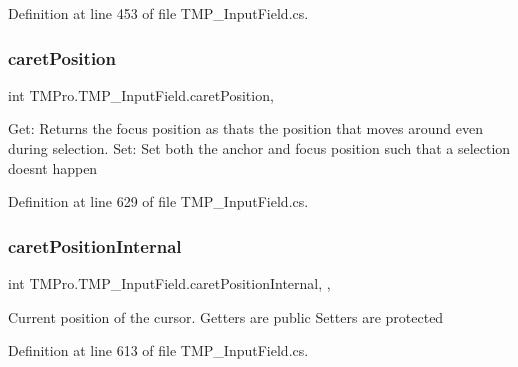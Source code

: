 Definition at line 453 of file T\+M\+P\+\_\+\+Input\+Field.\+cs.

\mbox{\label{class_t_m_pro_1_1_t_m_p___input_field_a3d3a39b5c399ed120a847fed2d842d81}} 
\subsubsection{\texorpdfstring{caretPosition}{caretPosition}}
{\footnotesize\ttfamily int T\+M\+Pro.\+T\+M\+P\+\_\+\+Input\+Field.\+caret\+Position\hspace{0.3cm}{\ttfamily [get]}, {\ttfamily [set]}}



Get\+: Returns the focus position as thats the position that moves around even during selection. Set\+: Set both the anchor and focus position such that a selection doesn\textquotesingle{}t happen 



Definition at line 629 of file T\+M\+P\+\_\+\+Input\+Field.\+cs.

\mbox{\label{class_t_m_pro_1_1_t_m_p___input_field_a48b9911b7de2a895d5411f4526a1acc1}} 
\subsubsection{\texorpdfstring{caretPositionInternal}{caretPositionInternal}}
{\footnotesize\ttfamily int T\+M\+Pro.\+T\+M\+P\+\_\+\+Input\+Field.\+caret\+Position\+Internal\hspace{0.3cm}{\ttfamily [get]}, {\ttfamily [set]}, {\ttfamily [protected]}}



Current position of the cursor. Getters are public Setters are protected 



Definition at line 613 of file T\+M\+P\+\_\+\+Input\+Field.\+cs.

\mbox{\label{class_t_m_pro_1_1_t_m_p___input_field_a370c7d141866bb8a55fe40919dd3c28d}} 
